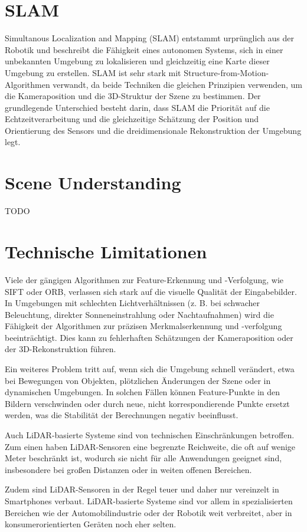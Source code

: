 \section{SLAM}\label{SLAM}

Simultanous Localization and Mapping (SLAM) entstammt urprünglich aus der Robotik und beschreibt die Fähigkeit eines autonomen Systems, sich in einer unbekannten Umgebung zu lokalisieren und gleichzeitig eine Karte dieser Umgebung zu erstellen. SLAM ist sehr stark mit Structure-from-Motion-Algorithmen verwandt, da beide Techniken die gleichen Prinzipien verwenden, um die Kameraposition und die 3D-Struktur der Szene zu bestimmen. Der grundlegende Unterschied besteht darin, dass SLAM die Priorität auf die Echtzeitverarbeitung und die gleichzeitige Schätzung der Position und Orientierung des Sensors und die dreidimensionale Rekonstruktion der Umgebung legt. 

\section{Scene Understanding}

TODO

\section{Technische Limitationen}

Viele der gängigen Algorithmen zur Feature-Erkennung und -Verfolgung, wie SIFT oder ORB, verlassen sich stark auf die visuelle Qualität der Eingabebilder. In Umgebungen mit schlechten Lichtverhältnissen (z. B. bei schwacher Beleuchtung, direkter Sonneneinstrahlung oder Nachtaufnahmen) wird die Fähigkeit der Algorithmen zur präzisen Merkmalserkennung und -verfolgung beeinträchtigt. Dies kann zu fehlerhaften Schätzungen der Kameraposition oder der 3D-Rekonstruktion führen.

Ein weiteres Problem tritt auf, wenn sich die Umgebung schnell verändert, etwa bei Bewegungen von Objekten, plötzlichen Änderungen der Szene oder in dynamischen Umgebungen. In solchen Fällen können Feature-Punkte in den Bildern verschwinden oder durch neue, nicht korrespondierende Punkte ersetzt werden, was die Stabilität der Berechnungen negativ beeinflusst.

Auch LiDAR-basierte Systeme sind von technischen Einschränkungen betroffen. Zum einen haben LiDAR-Sensoren eine begrenzte Reichweite, die oft auf wenige Meter beschränkt ist, wodurch sie nicht für alle Anwendungen geeignet sind, insbesondere bei großen Distanzen oder in weiten offenen Bereichen.

Zudem sind LiDAR-Sensoren in der Regel teuer und daher nur vereinzelt in Smartphones verbaut. LiDAR-basierte Systeme sind vor allem in spezialisierten Bereichen wie der Automobilindustrie oder der Robotik weit verbreitet, aber in konsumerorientierten Geräten noch eher selten.